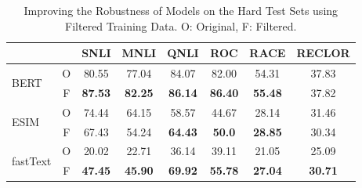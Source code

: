 \begin{table}[th]
\scriptsize
\centering
\begin{tabular}{p{5mm}ccccccc}
&    & SNLI & MNLI & QNLI & ROC & RACE & RECLOR \\ \hline
\multirow{2}{*}{BERT} &O& 80.55& 77.04 & 84.07 & 82.00 & 54.31& 37.83 \\ 
                      &F& \textbf{87.53} & \textbf{82.25} & \textbf{86.14} & \textbf{86.40} &\textbf{55.48} & 37.82 \\ \hline
\multirow{2}{*}{ESIM} &O& 74.44 & 64.15 & 58.57  & 44.67 &28.14 & 31.46 \\ 
		&F& 67.43 & 54.24 & \textbf{64.43} & \textbf{50.0} & \textbf{28.85} &30.34   \\ \hline
\multirow{2}{*}{fastText} &O& 20.02 & 22.71& 36.14 & 39.11 & 21.05& 25.09\\
                          &F & \textbf{47.45}&  \textbf{45.90} & \textbf{69.92}& \textbf{55.78} & \textbf{27.04} & \textbf{30.71} \\ \hline
\end{tabular}
\caption{\label{tab:filtered} Improving the Robustness of Models on the Hard Test Sets using
Filtered Training Data. O: Original, F: Filtered.}
\end{table}

